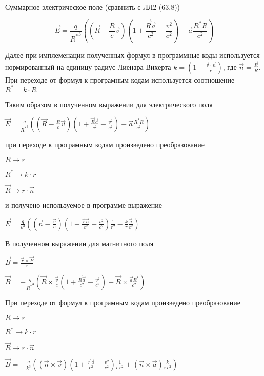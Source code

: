 \documentclass[11pt]{article}
\begin{document}
Суммарное электрическое поле (сравнить с ЛЛ2 (63,8))

\[\vec{E} = \frac{q}{{{R}^{*}}^{3}}\left( \left(\vec{R}-\frac{R}{c}\vec{v} \right) \left(1 + \frac{\vec{R}\vec{a}}{c^2} - \frac{v^2}{c^2} \right) - \vec{a}\frac{{R}^{*}R}{c^2} \right)\]

    Далее при имплеменации полученных формул в программные коды используется
нормированный на единицу радиус Лиенара Вихерта
\(k=\left( 1-\frac{\overrightarrow{v}\cdot \overrightarrow{n}}{c} \right)\),
где \(\overrightarrow{n} = \frac{\overrightarrow{R}}{R}\). При переходе
от формул к програмным кодам используется соотношение
\({R}^{*} = k\cdot R\)

    Таким образом в полученном выражении для электрического поля

    \(\vec{E} = \frac{q}{{{R}^{*}}^3}\left(\left(\vec{R}-\frac{R}{c}\vec{v}\right)\left(1 + \frac{\vec{R}\vec{a}}{c^2} - \frac{v^2}{c^2}\right) - \vec{a}\frac{{{R}^{*}}R}{c^2}\right)\)

при переходе к програмным кодам произведено преобразование

\({R} \rightarrow r\)

\({R}^{*} \rightarrow k\cdot r\)

\(\vec{R} \rightarrow r\cdot \vec{n}\)

и получено используемое в программе выражение

\(\vec{E} = \frac{q}{k^3}\left(\left(\vec{n}-\frac{\vec{v}}{c}\right)\left(1 + \frac{\vec{r}\vec{a}}{c^2} - \frac{v^2}{c^2}\right) \frac{1}{r^2} - \frac{k}{r}\frac{\vec{a}}{c^2}\right)\)

    В полученном выражении для магнитного поля

    \(\vec{B} = \frac{\vec{r}\times\vec{E}}{r}\)

\(\vec{B} = -\frac{q}{{{R}^{*}}^3}\left(\vec{R}\times\frac{\vec{v}}{c}\left(1 + \frac{\vec{R}\vec{a}}{c^2} - \frac{v^2}{c^2}\right) + \vec{R}\times\frac{\vec{a}{{R}^{*}}}{c^2}\right)\)

При переходе от формул к програмным кодам произведено преобразование

\({R} \rightarrow r\)

\({R}^{*} \rightarrow k\cdot r\)

\(\vec{R} \rightarrow r\cdot \vec{n}\)

\(\vec{B} = -\frac{q}{k^3}\left( \left(\vec{n}\times{\vec{v}}\right) \left(1 + \frac{\vec{r}\vec{a}}{c^2} - \frac{v^2}{c^2}\right) \frac{1}{c\,r^2} + \left(\vec{n}\times\vec{a}\right) \frac{k}{r\,c^2}\right)\)
\end{document}

